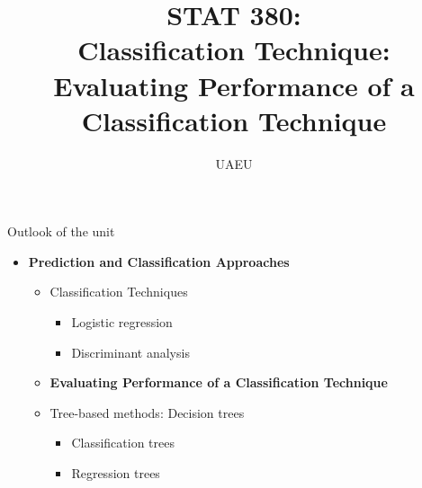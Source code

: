 \documentclass[compress]{beamer}
\title{  STAT 380:\\ {\color{black} Classification Technique:   Evaluating  Performance of a Classification Technique}}
\author[UAEU]
{UAEU}
\institute[IIM] %
{
  \inst{}%
  \vspace{0.1in}

  
}
\date{}
\begin{document}
\maketitle





\begin{frame}{Outlook of the unit}
	
	\begin{itemize}
		\item \textbf{Prediction and Classification Approaches}
		\vspace{0.2cm}
	\begin{itemize}

		\item Classification Techniques
			\begin{itemize}
			\item Logistic regression
				\vspace{0.2cm}
			\item Discriminant analysis
					\end{itemize}
			\vspace{0.2cm}
			\item {\bf \color{airforceblue}  Evaluating  Performance of a Classification Technique}
				\vspace{0.2cm}
			\item Tree-based methods: Decision trees
				\vspace{0.2cm}
				\begin{itemize}
				\item Classification trees
				\vspace{0.2cm}
				\item
				Regression trees
	\end{itemize}
		\end{itemize}
		\end{itemize}		
\end{frame}


\end{document}
